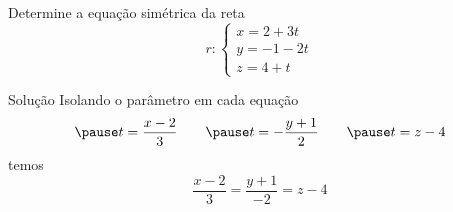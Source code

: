 \begin{question}
  Determine a equação simétrica da reta
  \[
    r\colon
    \begin{cases}
      x =  2 + 3t \\
      y = -1 - 2t \\
      z =  4 +  t
    \end{cases}
  \]
\end{question}

\begin{resolution}{Solução}
  Isolando o parâmetro em cada equação
  \[
    \pause
    t =  \frac{x-2}{3} \qquad\pause
    t = -\frac{y+1}{2} \qquad\pause
    t = z-4
  \]
  \pause
  temos
  \[
    \frac{x-2}{3}
    = \frac{y+1}{-2}
    = z-4
  \]
\end{resolution}

\endinput
